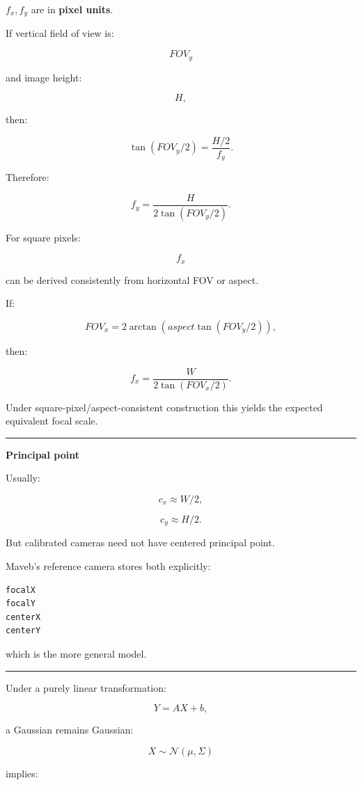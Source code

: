 \(f_x,f_y\) are in \textbf{pixel units}.

If vertical field of view is:

\[
FOV_y
\]

and image height:

\[
H,
\]

then:

\[
\tan(FOV_y/2)
=
\frac{H/2}{f_y}.
\]

Therefore:

\[
\boxed{
f_y=
\frac{H}
{2\tan(FOV_y/2)}.
}
\]

For square pixels:

\[
f_x
\]

can be derived consistently from horizontal FOV or aspect.

If:

\[
FOV_x
=
2\arctan(
aspect\tan(FOV_y/2)
),
\]

then:

\[
f_x=
\frac{W}
{2\tan(FOV_x/2)}.
\]

Under square-pixel/aspect-consistent construction this yields the expected equivalent focal scale.

\begin{center}\rule{0.5\linewidth}{0.5pt}\end{center}

\textbf{Principal point}

Usually:

\[
c_x\approx W/2,
\]

\[
c_y\approx H/2.
\]

But calibrated cameras need not have centered principal point.

Maveb's reference camera stores both explicitly:

\protect{}\label{30s5gu}%
\begin{verbatim}
focalX
focalY
centerX
centerY
\end{verbatim}

which is the more general model.

\begin{center}\rule{0.5\linewidth}{0.5pt}\end{center}

Under a purely linear transformation:

\[
Y=AX+b,
\]

a Gaussian remains Gaussian:

\[
X\sim\mathcal N(\mu,\Sigma)
\]

implies:

